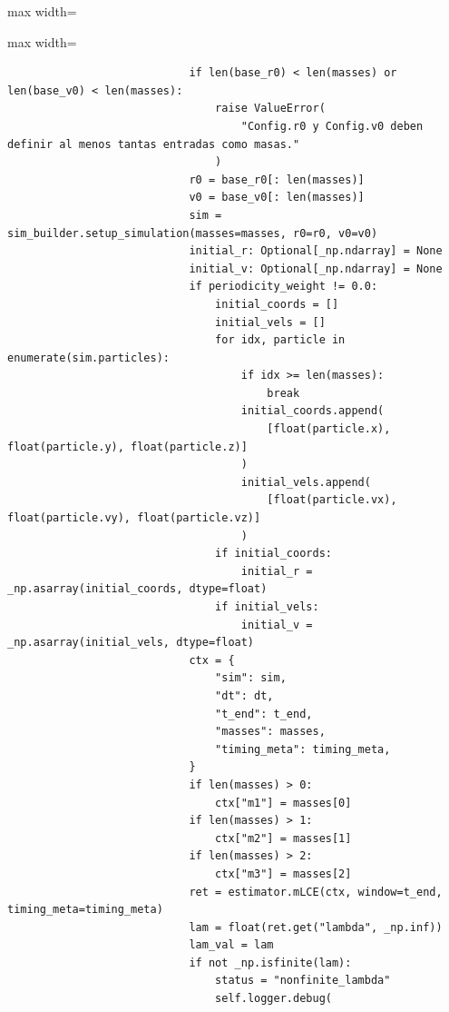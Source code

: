 \begin{listing}[H]
\begin{adjustbox}{max width=\textwidth}
\begin{minipage}{\linewidth}
{\begin{adjustbox}{max width=\textwidth}
\begin{minipage}{\textwidth}
\begin{verbatim}
                            if len(base_r0) < len(masses) or len(base_v0) < len(masses):
                                raise ValueError(
                                    "Config.r0 y Config.v0 deben definir al menos tantas entradas como masas."
                                )
                            r0 = base_r0[: len(masses)]
                            v0 = base_v0[: len(masses)]
                            sim = sim_builder.setup_simulation(masses=masses, r0=r0, v0=v0)
                            initial_r: Optional[_np.ndarray] = None
                            initial_v: Optional[_np.ndarray] = None
                            if periodicity_weight != 0.0:
                                initial_coords = []
                                initial_vels = []
                                for idx, particle in enumerate(sim.particles):
                                    if idx >= len(masses):
                                        break
                                    initial_coords.append(
                                        [float(particle.x), float(particle.y), float(particle.z)]
                                    )
                                    initial_vels.append(
                                        [float(particle.vx), float(particle.vy), float(particle.vz)]
                                    )
                                if initial_coords:
                                    initial_r = _np.asarray(initial_coords, dtype=float)
                                if initial_vels:
                                    initial_v = _np.asarray(initial_vels, dtype=float)
                            ctx = {
                                "sim": sim,
                                "dt": dt,
                                "t_end": t_end,
                                "masses": masses,
                                "timing_meta": timing_meta,
                            }
                            if len(masses) > 0:
                                ctx["m1"] = masses[0]
                            if len(masses) > 1:
                                ctx["m2"] = masses[1]
                            if len(masses) > 2:
                                ctx["m3"] = masses[2]
                            ret = estimator.mLCE(ctx, window=t_end, timing_meta=timing_meta)
                            lam = float(ret.get("lambda", _np.inf))
                            lam_val = lam
                            if not _np.isfinite(lam):
                                status = "nonfinite_lambda"
                                self.logger.debug(

\end{verbatim}
\end{minipage}
\end{adjustbox}}
\end{minipage}
\end{adjustbox}
\end{listing}
